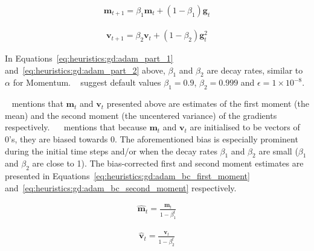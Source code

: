 \begin{equation}
      \label{eq:heuristics:gd:adam_part_1}
      \begin{split}
            \boldsymbol{m}_{t+1} = \beta_{1}\boldsymbol{m}_{t} + (1 - \beta_{1})\boldsymbol{g}_{t}
      \end{split}
\end{equation}

\begin{equation}
      \label{eq:heuristics:gd:adam_part_2}
      \begin{split}
            \boldsymbol{v}_{t+1} = \beta_{2}\boldsymbol{v}_{t} + (1 - \beta_{2})\boldsymbol{g}^{2}_{t}
      \end{split}
\end{equation}

In Equations~\eqref{eq:heuristics:gd:adam_part_1} and~\eqref{eq:heuristics:gd:adam_part_2} above, $\beta_{1}$ and $\beta_{2}$ are decay rates, similar to $\alpha$ for \acs{Momentum}. \citeauthor{ref:kingma:2014}~\cite{ref:kingma:2014} suggest default values $\beta_{1}=0.9$, $\beta_{2}=0.999$ and $\epsilon = 1 \times 10^{-8}$.

\citeauthor{ref:ruder:2016}~\cite{ref:ruder:2016} mentions that $\boldsymbol{m}_{t}$ and $\boldsymbol{v}_{t}$ presented above are estimates of the first moment (the mean) and the second moment (the uncentered variance) of the gradients respectively. ~\citeauthor{ref:kingma:2014}~\cite{ref:kingma:2014} mentions that because $\boldsymbol{m}_{t}$ and $\boldsymbol{v}_{t}$ are initialised to be vectors of 0's, they are biased towards 0. The aforementioned bias is especially prominent during the initial time steps and/or when the decay rates $\beta_{1}$ and $\beta_{2}$ are small ($\beta_{1}$ and $\beta_{2}$ are close to 1). The bias-corrected first and second moment estimates are presented in Equations~\eqref{eq:heuristics:gd:adam_bc_first_moment} and~\eqref{eq:heuristics:gd:adam_bc_second_moment} respectively.

\begin{equation}
      \label{eq:heuristics:gd:adam_bc_first_moment}
      \begin{split}
            \hat{\boldsymbol{m}}_{t} = \frac{\boldsymbol{m}_{t}}{1 - \beta^{t}_{1}}
      \end{split}
\end{equation}

\begin{equation}
      \label{eq:heuristics:gd:adam_bc_second_moment}
      \begin{split}
            \hat{\boldsymbol{v}}_{t} = \frac{\boldsymbol{v}_{t}}{1 - \beta^{t}_{2}}
      \end{split}
\end{equation}

